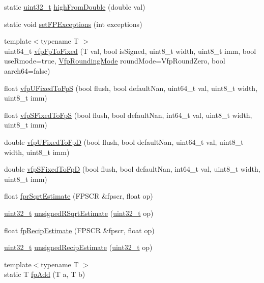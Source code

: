 \begin{DoxyCompactItemize}
\item 
static \hyperlink{Type_8hh_a435d1572bf3f880d55459d9805097f62}{uint32\_\-t} \hyperlink{namespaceArmISA_a438b7674ff80ebfbdd1f6a769702f2b1}{highFromDouble} (double val)
\item 
static void \hyperlink{namespaceArmISA_ad838c0ca7d57f7fc21e22e71b43ad41d}{setFPExceptions} (int exceptions)
\item 
{\footnotesize template$<$typename T $>$ }\\uint64\_\-t \hyperlink{namespaceArmISA_a7487fef67499f3837452ca24f8793cd9}{vfpFpToFixed} (T val, bool isSigned, uint8\_\-t width, uint8\_\-t imm, bool useRmode=true, \hyperlink{namespaceArmISA_a18dfa032073e1045ee46441e7c1d1dc3}{VfpRoundingMode} roundMode=VfpRoundZero, bool aarch64=false)
\item 
float \hyperlink{namespaceArmISA_aa60ca51f1e8343058d1dcb2ad16b25ef}{vfpUFixedToFpS} (bool flush, bool defaultNan, uint64\_\-t val, uint8\_\-t width, uint8\_\-t imm)
\item 
float \hyperlink{namespaceArmISA_a1d4f867895cc81891a1140368c97a9a9}{vfpSFixedToFpS} (bool flush, bool defaultNan, int64\_\-t val, uint8\_\-t width, uint8\_\-t imm)
\item 
double \hyperlink{namespaceArmISA_aebcf4a52232f8eb2223e99648047e3cd}{vfpUFixedToFpD} (bool flush, bool defaultNan, uint64\_\-t val, uint8\_\-t width, uint8\_\-t imm)
\item 
double \hyperlink{namespaceArmISA_aa8c9e4b53c67cba6b27c037e4fce2294}{vfpSFixedToFpD} (bool flush, bool defaultNan, int64\_\-t val, uint8\_\-t width, uint8\_\-t imm)
\item 
float \hyperlink{namespaceArmISA_a5a872918a3448f9e2a9971da1eb49c0f}{fprSqrtEstimate} (FPSCR \&fpscr, float op)
\item 
\hyperlink{Type_8hh_a435d1572bf3f880d55459d9805097f62}{uint32\_\-t} \hyperlink{namespaceArmISA_aec78abc20e7d47f756c3bec86b8e751c}{unsignedRSqrtEstimate} (\hyperlink{Type_8hh_a435d1572bf3f880d55459d9805097f62}{uint32\_\-t} op)
\item 
float \hyperlink{namespaceArmISA_a32d41eeb01fd74a159bd0ed1a1901816}{fpRecipEstimate} (FPSCR \&fpscr, float op)
\item 
\hyperlink{Type_8hh_a435d1572bf3f880d55459d9805097f62}{uint32\_\-t} \hyperlink{namespaceArmISA_aaabdaf45fc8531f417c0460cd3e038c4}{unsignedRecipEstimate} (\hyperlink{Type_8hh_a435d1572bf3f880d55459d9805097f62}{uint32\_\-t} op)
\item 
{\footnotesize template$<$typename T $>$ }\\static T \hyperlink{namespaceArmISA_a43f38e5edcb0f6f4f36317b53135e35f}{fpAdd} (T a, T b)

\end{DoxyCompactItemize}
